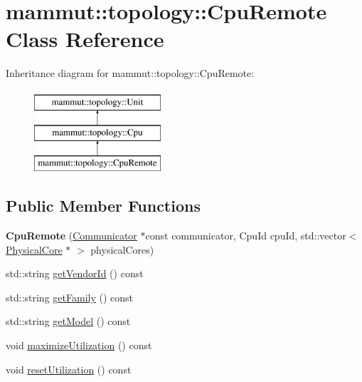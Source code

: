 \hypertarget{classmammut_1_1topology_1_1CpuRemote}{\section{mammut\-:\-:topology\-:\-:Cpu\-Remote Class Reference}
\label{classmammut_1_1topology_1_1CpuRemote}
}
Inheritance diagram for mammut\-:\-:topology\-:\-:Cpu\-Remote\-:\begin{figure}[H]
\begin{center}
\leavevmode
\includegraphics[height=3.000000cm]{classmammut_1_1topology_1_1CpuRemote}
\end{center}
\end{figure}
\subsection*{Public Member Functions}
\begin{DoxyCompactItemize}
\item 
\hypertarget{classmammut_1_1topology_1_1CpuRemote_abba5a5ebf1457ade6bfb6d5485f51e2f}{{\bfseries Cpu\-Remote} (\hyperlink{classmammut_1_1Communicator}{Communicator} $\ast$const communicator, Cpu\-Id cpu\-Id, std\-::vector$<$ \hyperlink{classmammut_1_1topology_1_1PhysicalCore}{Physical\-Core} $\ast$ $>$ physical\-Cores)}\label{classmammut_1_1topology_1_1CpuRemote_abba5a5ebf1457ade6bfb6d5485f51e2f}

\item 
std\-::string \hyperlink{classmammut_1_1topology_1_1CpuRemote_a3a49baf79550998a4d8782587cb27704}{get\-Vendor\-Id} () const 
\item 
std\-::string \hyperlink{classmammut_1_1topology_1_1CpuRemote_aacd6e5bee5d9b348220749efc614b6d1}{get\-Family} () const 
\item 
std\-::string \hyperlink{classmammut_1_1topology_1_1CpuRemote_a7d57ba15fa3db7f444c5757c5da93bdb}{get\-Model} () const 
\item 
void \hyperlink{classmammut_1_1topology_1_1CpuRemote_a1f25bdc6f2b049a831a03ba702699626}{maximize\-Utilization} () const 
\item 
void \hyperlink{classmammut_1_1topology_1_1CpuRemote_a689af84ac46ab57081fc4fa47c9992b6}{reset\-Utilization} () const 
\end{DoxyCompactItemize}
